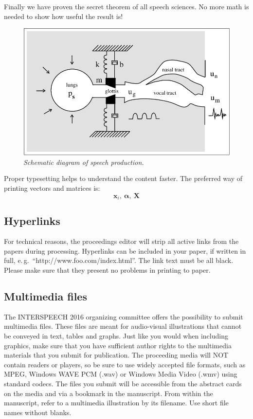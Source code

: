 \documentclass[a4paper]{article}
\def\vec#1{\ensuremath{\bm{{#1}}}}
\def\mat#1{\vec{#1}}
\begin{document}
      Finally we have proven the secret theorem of all speech sciences.
      No more math is needed to show how useful the result is!

      \begin{figure}[t]
        \centering
        \includegraphics[width=\linewidth]{figure.pdf}
        \caption{{\it Schematic diagram of speech production.}}
        \label{fig:speech_production}
      \end{figure}
  
      Proper typesetting helps to understand the content faster.
      The preferred way of printing vectors and matrices is:
      \begin{equation}
        \vec{x}_i,~\vec{\alpha},~\mat{X}
      \end{equation}

  
    \subsection{Hyperlinks}

      For technical reasons, the proceedings editor will strip all active links from the papers during processing. 
      Hyperlinks can be included in your paper, if written in full, e.\,g.\ ``http://www.foo.com/index.html''.
      The link text must be all black. 
      Please make sure that they present no problems in printing to paper.

  
    \subsection{Multimedia files}

      The INTERSPEECH 2016 organizing committee offers the possibility to submit multimedia files. 
      These files are meant for audio-visual illustrations that cannot be conveyed in text, tables and graphs.
      Just like you would when including graphics, make sure that you have sufficient author rights to the multimedia materials that you submit for publication. 
      The proceeding media will NOT contain readers or players, so be sure to use widely accepted file formats, such as MPEG, Windows WAVE PCM (.wav) or Windows Media Video (.wmv) using standard codecs.
      The files you submit will be accessible from the abstract cards on the media and via a bookmark in the manuscript.
      From within the manuscript, refer to a multimedia illustration by its filename. Use short file names without blanks.
\end{document}
